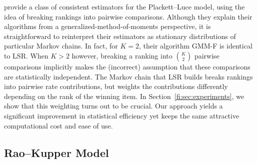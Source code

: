 \citet{azari2013generalized} provide a class of consistent estimators for the Plackett--Luce model, using the idea of breaking rankings into pairwise comparisons.
Although they explain their algorithms from a generalized-method-of-moments perspective, it is straightforward to reinterpret their estimators as stationary distributions of particular Markov chains.
In fact, for $K = 2$, their algorithm GMM-F is identical to LSR.
When $K > 2$ however, breaking a ranking into $\binom{K}{2}$ pairwise comparisons implicitly makes the (incorrect) assumption that these comparisons are statistically independent.
The Markov chain that LSR builds breaks rankings into pairwise rate contributions, but weights the contributions differently depending on the rank of the winning item.
In Section~\ref{fi:sec:experiments}, we show that this weighting turns out to be crucial.
Our approach yields a significant improvement in statistical efficiency yet keeps the same attractive computational cost and ease of use.


\subsection{Rao--Kupper Model}
\label{fi:sec:ties}

